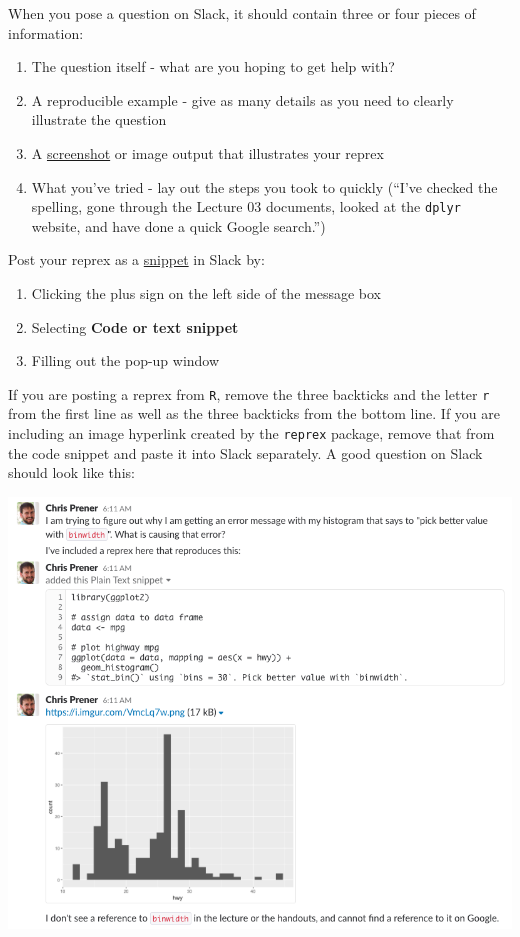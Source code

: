 \documentclass[]{book}
\providecommand{\tightlist}{%
  \setlength{\itemsep}{0pt}\setlength{\parskip}{0pt}}
\theoremstyle{definition}
\theoremstyle{definition}
\theoremstyle{definition}
\theoremstyle{remark}
\begin{document}
When you pose a question on Slack, it should contain three or four
pieces of information:

\begin{enumerate}
\def\labelenumi{\arabic{enumi}.}
\tightlist
\item
  The question itself - what are you hoping to get help with?
\item
  A reproducible example - give as many details as you need to clearly
  illustrate the question
\item
  A \href{https://www.take-a-screenshot.org}{screenshot} or image output
  that illustrates your reprex
\item
  What you've tried - lay out the steps you took to quickly (``I've
  checked the spelling, gone through the Lecture 03 documents, looked at
  the \texttt{dplyr} website, and have done a quick Google search.'')
\end{enumerate}

Post your reprex as a
\href{https://get.slack.help/hc/en-us/articles/204145658-Create-a-snippet}{snippet}
in Slack by:

\begin{enumerate}
\def\labelenumi{\arabic{enumi}.}
\tightlist
\item
  Clicking the plus sign on the left side of the message box
\item
  Selecting \textbf{Code or text snippet}
\item
  Filling out the pop-up window
\end{enumerate}

If you are posting a reprex from \texttt{R}, remove the three backticks
and the letter \texttt{r} from the first line as well as the three
backticks from the bottom line. If you are including an image hyperlink
created by the \texttt{reprex} package, remove that from the code
snippet and paste it into Slack separately. A good question on Slack
should look like this:

\begin{center}\includegraphics[width=0.9\linewidth]{images/slackQuestion} \end{center}
\end{document}
